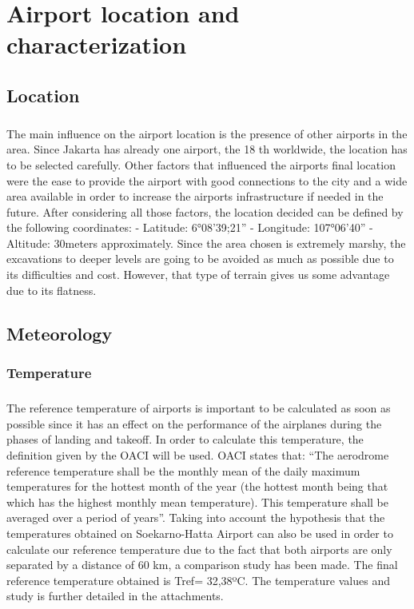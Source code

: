 \chapter{Airport location and characterization}
	\section{Location}
\paragraph{} The main influence on the airport location is the presence of other airports in the area. Since
Jakarta has already one airport, the 18 th worldwide, the location has to be selected carefully.
Other factors that influenced the airports final location were the ease to provide the airport
with good connections to the city and a wide area available in order to increase the airports
infrastructure if needed in the future.
After considering all those factors, the location decided can be defined by the following
coordinates:
- Latitude: 6°08'39;21''
- Longitude: 107°06'40''
- Altitude: 30meters approximately.
Since the area chosen is extremely marshy, the excavations to deeper levels are going to be
avoided as much as possible due to its difficulties and cost. However, that type of terrain gives
us some advantage due to its flatness.
	\section{Meteorology}
		\subsection{Temperature}
		\paragraph{}The reference temperature of airports is important to be calculated as soon as possible since it has an effect on the performance of the airplanes during the phases of landing and takeoff. 
		In order to calculate this temperature, the definition given by the OACI will be used. OACI states that: “The aerodrome reference temperature shall be the monthly mean of the daily maximum temperatures for the hottest month of the year (the hottest month being that which has the highest monthly mean temperature). This temperature shall be averaged over a period of years”.
		Taking into account the hypothesis that the temperatures obtained on Soekarno-Hatta Airport can also be used in order to calculate our reference temperature due to the fact that both airports are only separated by a distance of 60 km, a comparison study has been made. 
		The final reference temperature obtained is Tref= 32,38ºC. 
		The temperature values and study is further detailed in the attachments.
		
